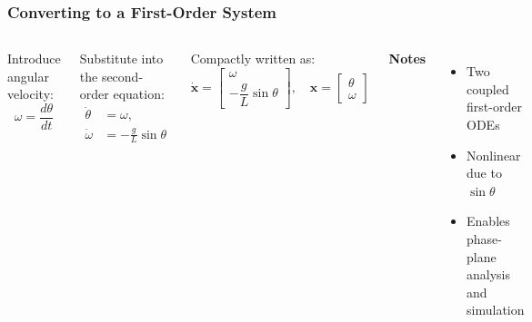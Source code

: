 \documentclass{beamer}
\begin{document}
\begin{frame}
\frametitle{Converting to a First-Order System}
\scriptsize
\begin{columns}[T,onlytextwidth]

  Introduce angular velocity:
  \[
    \omega = \frac{d\theta}{dt}
  \]

  Substitute into the second-order equation:
  \[
    \begin{aligned}
      \dot{\theta} &= \omega, \\
      \dot{\omega} &= -\frac{g}{L}\sin\theta
    \end{aligned}
  \]

  Compactly written as:
  \[
    \dot{\mathbf{x}} =
    \begin{bmatrix}
      \omega \\[2pt]
      -\dfrac{g}{L}\sin\theta
    \end{bmatrix},
    \quad
    \mathbf{x} =
    \begin{bmatrix}
      \theta \\[2pt]
      \omega
    \end{bmatrix}
  \]

  \textbf{Notes}
  \vspace{-4pt}
  \begin{itemize}\itemsep2pt
    \item Two coupled first-order ODEs
    \item Nonlinear due to \( \sin\theta \)
    \item Enables phase-plane analysis and simulation
  \end{itemize}

\end{columns}
\end{frame}
\end{document}

